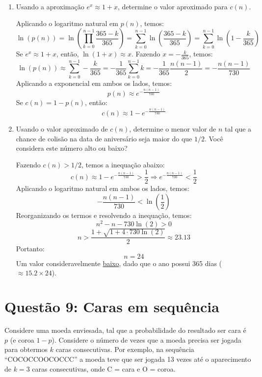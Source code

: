 \documentclass[12 pt]{article}
\begin{document}
\begin{enumerate}
\begin{tcolorbox}[colframe=black, title=Resposta:]
    \end{tcolorbox}
    \newpage
    \item Usando a aproximação $e^x \approx 1 + x$, determine o valor aproximado para $c(n)$.
    \begin{tcolorbox}[colframe=black, title=Resposta:]
        Aplicando o logaritmo natural em $p(n)$, temos:
        $$\ln(p(n)) = \ln\left(\prod _{k=0}^{n-1} \frac{365-k}{365}\right) = \sum _{k=0}^{n-1} \ln\left(\frac{365-k}{365}\right) = \sum _{k=0}^{n-1} \ln\left(1 - \frac{k}{365}\right)$$
        Se $e^x \approx 1 + x$, então, $\ln(1 + x) \approx x$. Fazendo $x=-\frac{k}{365}$, temos:
        $$\ln(p(n)) \approx \sum _{k=0}^{n-1} -\frac{k}{365} = -\frac{1}{365} \sum _{k=0}^{n-1} k = -\frac{1}{365}\frac{n(n-1)}{2} = -\frac{n(n-1)}{730}$$
        Aplicando a exponencial em ambos os lados, temos:
        $$p(n) \approx e^{-\frac{n(n-1)}{730}}$$
        Se $c(n) = 1 - p(n)$, então:
        $$\boxed{c(n) \approx 1 - e^{-\frac{n(n-1)}{730}}}$$
    \end{tcolorbox}
    \item Usando o valor aproximado de $c(n)$, determine o menor valor de $n$ tal que a chance de colisão na data de aniversário seja maior do que $1/2$. Você considera este número alto ou baixo?
    \begin{tcolorbox}[colframe=black, title=Resposta:]
        Fazendo $c(n) > 1/2$, temos a inequação abaixo:
        $$ c(n) \approx 1 - e^{-\frac{n(n-1)}{730}} > \frac{1}{2} \Rightarrow e^{-\frac{n(n-1)}{730}} < \frac{1}{2}$$
        Aplicando o logaritmo natural em ambos os lados, temos:
        $$ -\frac{n(n-1)}{730} < \ln\left(\frac{1}{2}\right)$$
        Reorganizando os termos e resolvendo a inequação, temos:
        $$ n^2 - n - 730 \ln(2) > 0$$
        $$ n > \frac{1 + \sqrt{1 + 4 \cdot 730 \ln(2)}}{2} \approx 23.13$$
        Portanto: 
        $$\boxed{n = 24}$$
        Um valor consideravelmente \underline{baixo}, dado que o ano possui 365 dias ($\approx 15.2 \times 24$).
    \end{tcolorbox}
\end{enumerate}

\section*{Questão 9: Caras em sequência}
Considere uma moeda enviesada, tal que a probabilidade do resultado ser cara é $p$ (e coroa $1 - p$).
Considere o número de vezes que a moeda precisa ser jogada para obtermos $k$ caras consecutivas. Por exemplo, na sequência ``COCOCCOOCOCCC'' a moeda teve que ser jogada 13 vezes até o aparecimento de $k = 3$ caras consecutivas, onde C = cara e O = coroa.
\end{document}
